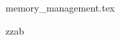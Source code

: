 \documentclass{exam}
\begin{document}


\begin{questions}

                    \printanswers


    {memory_management.tex}


         \question  zzab



\end{questions}
\end{document}
